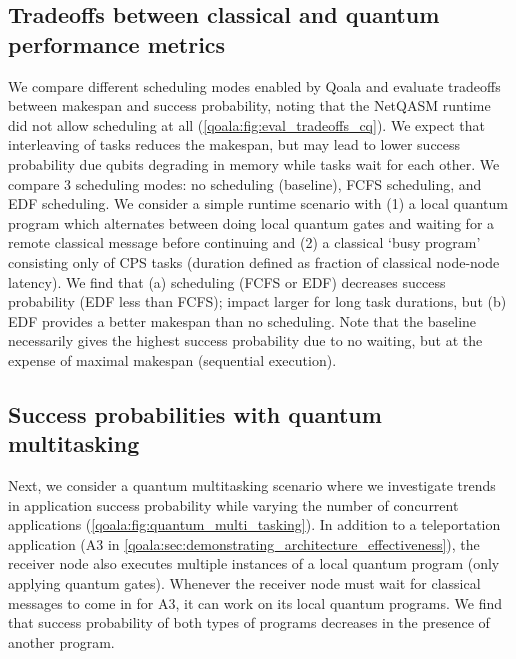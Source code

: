 \subsection{Tradeoffs between classical and quantum performance metrics}
\label{qoala:sec:effectiveness_of_task_splitting}
We compare different scheduling modes enabled by Qoala and evaluate tradeoffs between makespan and success probability, noting that the NetQASM runtime did not allow scheduling at all (\cref{qoala:fig:eval_tradeoffs_cq}).
We expect that interleaving of tasks reduces the makespan, but may lead to lower success probability due qubits degrading in memory while tasks wait for each other.
We compare 3 scheduling modes: no scheduling (baseline), FCFS scheduling, and EDF scheduling.
We consider a simple runtime scenario with 
(1) a local quantum program which alternates between doing local quantum gates and waiting for a remote classical message before continuing and 
(2) a classical `busy program' consisting only of CPS tasks (duration defined as fraction of classical node-node latency).
We find that
(a) scheduling (FCFS or EDF) decreases success probability (EDF less than FCFS); impact larger for long task durations, but
(b) EDF provides a better makespan than no scheduling.
Note that the baseline necessarily gives the highest success probability due to no waiting, but at the expense of maximal makespan (sequential execution).

\subsection{Success probabilities with quantum multitasking}
\label{qoala:sec:quantum_multitasking}
Next, we consider a quantum multitasking scenario where we investigate trends in application success probability while varying the number of concurrent applications (\cref{qoala:fig:quantum_multi_tasking}).
In addition to a teleportation application (A3 in \cref{qoala:sec:demonstrating_architecture_effectiveness}), the receiver node also executes multiple instances of a local quantum program (only applying quantum gates).
Whenever the receiver node must wait for classical messages to come in for A3, it can work on its local quantum programs.
We find that success probability of both types of programs decreases in the presence of another program.

